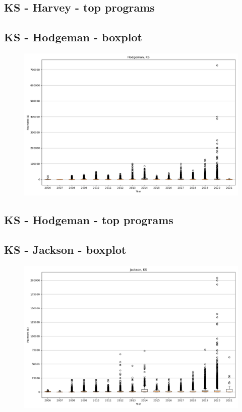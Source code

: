 \subsection*{KS - Harvey - top programs}

\newpage
\subsection*{KS - Hodgeman - boxplot}
\begin{figure}[h]
\centering
\includegraphics[width=7in]{../output/boxplots/counties/Hodgeman-KS_boxplot.png}
\end{figure}


\subsection*{KS - Hodgeman - top programs}

\newpage
\subsection*{KS - Jackson - boxplot}
\begin{figure}[h]
\centering
\includegraphics[width=7in]{../output/boxplots/counties/Jackson-KS_boxplot.png}
\end{figure}


